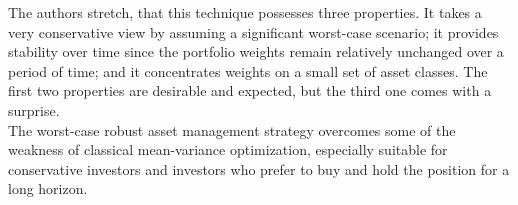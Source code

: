 The authors stretch, that this technique possesses three properties. It takes a very conservative view by assuming a significant worst-case scenario; it provides stability over time since the portfolio weights remain relatively unchanged over a period of time; and it concentrates weights on a small set of asset classes. The first two properties are desirable and expected, but the third one comes with a surprise. \\
The worst-case robust asset management strategy overcomes some of the weakness of classical mean-variance optimization, especially suitable for conservative investors and investors who prefer to buy and hold the position for a long horizon.